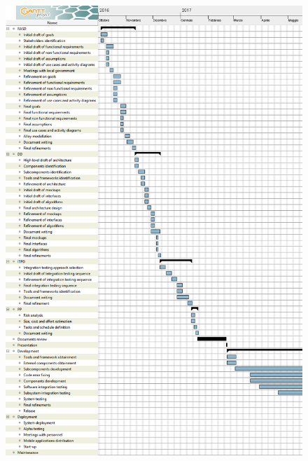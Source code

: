 \begin{figure}[H]
	\centering
	\includegraphics[width=\textwidth, keepaspectratio]{task_and_schedule/diagrams/Tasks1.png}
\end{figure}

